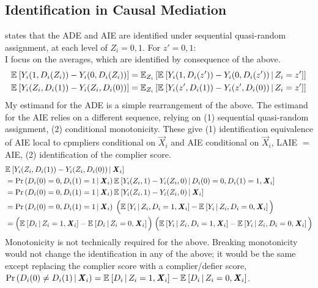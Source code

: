 \subsection{Identification in Causal Mediation}
\label{appendix:identification}
\citet[Theorem~1]{imai2010identification} states that the ADE and AIE are identified under sequential quasi-random assignment, at each level of $Z_i = 0,1$.
For $z' = 0,1$: \\
I focus on the averages, which are identified by consequence of the above.
\begin{align*}
    \E{ Y_i(1, D_i(Z_i)) - Y_i(0, D_i(Z_i))}
    &= \E[Z_i]{\Egiven{ Y_i(1, D_i(z')) - Y_i(0, D_i(z'))}{Z_i = z'}} \\
    \E{ Y_i(Z_i, D_i(1)) - Y_i(Z_i, D_i(0))}
    & = \E[Z_i]{\Egiven{ Y_i(z', D_i(1)) - Y_i(z', D_i(0))}{Z_i = z'}}
\end{align*}
My estimand for the ADE is a simple rearrangement of the above.
The estimand for the AIE relies on a different sequence, relying on (1) sequential quasi-random assignment, (2) conditional monotonicity.
These give (1) identification equivalence of AIE local to cpmpliers conditional on $\vec X_i$ and AIE conditional on $\vec X_i$, LAIE $=$ AIE, (2) identification of the complier score.
\begin{align*}
    & \Egiven{ Y_i(Z_i, D_i(1)) - Y_i(Z_i, D_i(0))}{\vec X_i} \\
    & = \Probgiven{D_i(0) = 0, D_i(1) = 1}{\vec X_i}
        \Egiven{ Y_i(Z_i, 1) - Y_i(Z_i, 0)}{D_i(0) = 0, D_i(1) = 1, \vec X_i} \\
    & = \Probgiven{D_i(0) = 0, D_i(1) = 1}{\vec X_i}
        \Egiven{ Y_i(Z_i, 1) - Y_i(Z_i, 0)}{\vec X_i} \\
    & = \Probgiven{D_i(0) = 0, D_i(1) = 1}{\vec X_i}
        \; \Big( \Egiven{Y_i}{Z_i, D_i = 1, \vec X_i}
            - \Egiven{Y_i}{Z_i, D_i = 0, \vec X_i} \Big) \\
    & = \Big( \Egiven{D_i}{Z_i = 1, \vec X_i} - \Egiven{D_i}{Z_i = 0, \vec X_i}
        \Big) \;
        \Big( \Egiven{Y_i}{Z_i, D_i = 1, \vec X_i}
            - \Egiven{Y_i}{Z_i, D_i = 0, \vec X_i} \Big)
\end{align*}
Monotonicity is not technically required for the above.
Breaking monotonicity would not change the identification in any of the above; it would be the same except replacing the complier score with a complier/defier score, $\Probgiven{D_i(0) \neq D_i(1)}{\vec X_i} = \Egiven{D_i}{Z_i = 1, \vec X_i} - \Egiven{D_i}{Z_i = 0, \vec X_i}$.

